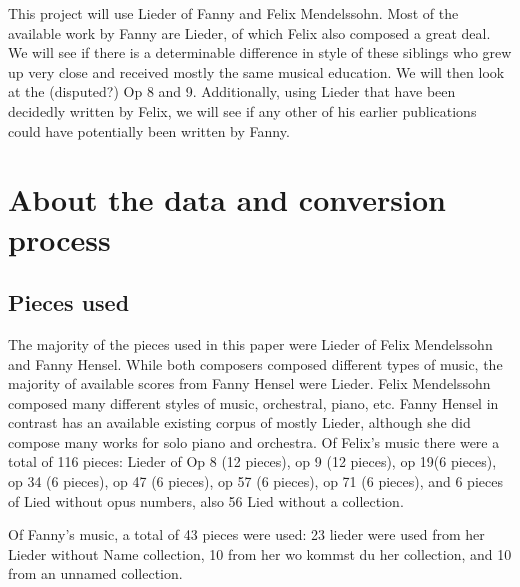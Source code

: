 \documentclass[12pt,twoside]{reedthesis}
\theoremstyle{definition}
\theoremstyle{definition}
\theoremstyle{definition}
\theoremstyle{remark}
\begin{document}
This project will use Lieder of Fanny and Felix Mendelssohn. Most of the
available work by Fanny are Lieder, of which Felix also composed a great
deal. We will see if there is a determinable difference in style of
these siblings who grew up very close and received mostly the same
musical education. We will then look at the (disputed?) Op 8 and 9.
Additionally, using Lieder that have been decidedly written by Felix, we
will see if any other of his earlier publications could have potentially
been written by Fanny.

\chapter{About the data and conversion
process}\label{about-the-data-and-conversion-process}

\section{Pieces used}\label{pieces-used}

The majority of the pieces used in this paper were Lieder of Felix
Mendelssohn and Fanny Hensel. While both composers composed different
types of music, the majority of available scores from Fanny Hensel were
Lieder. Felix Mendelssohn composed many different styles of music,
orchestral, piano, etc. Fanny Hensel in contrast has an available
existing corpus of mostly Lieder, although she did compose many works
for solo piano and orchestra. Of Felix's music there were a total of 116
pieces: Lieder of Op 8 (12 pieces), op 9 (12 pieces), op 19(6 pieces),
op 34 (6 pieces), op 47 (6 pieces), op 57 (6 pieces), op 71 (6 pieces),
and 6 pieces of Lied without opus numbers, also 56 Lied without a
collection.

Of Fanny's music, a total of 43 pieces were used: 23 lieder were used
from her Lieder without Name collection, 10 from her wo kommst du her
collection, and 10 from an unnamed collection.
\end{document}
